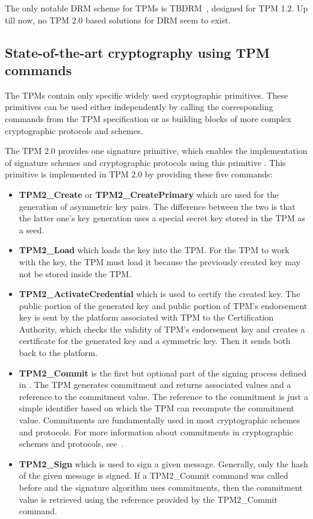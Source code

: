 The only notable DRM scheme for TPMs is TBDRM~\cite{yu2009tbdrm}, designed for TPM 1.2. Up till now, no TPM 2.0 based solutions for DRM seem to exist. 

\subsection{State-of-the-art cryptography using TPM commands}
The TPMs contain only specific widely used cryptographic primitives. These primitives can be used either independently by calling the corresponding commands from the TPM specification or as building blocks of more complex cryptographic protocols and schemes. 

The TPM 2.0 provides one signature primitive, which enables the implementation of signature schemes and cryptographic protocols using this primitive \cite{chen2013flexible}. This primitive is implemented in TPM 2.0 by providing these five commands:
\begin{itemize}
    \item \textbf{TPM2\_Create} or \textbf{TPM2\_CreatePrimary} which are used for the generation of asymmetric key pairs. The difference between the two is that the latter one's key generation uses a special secret key stored in the TPM as a seed.
    \item \textbf{TPM2\_Load} which loads the key into the TPM. For the TPM to work with the key, the TPM must load it because the previously created key may not be stored inside the TPM.
    \item \textbf{TPM2\_ActivateCredential} which is used to certify the created key. The public portion of the generated key and public portion of TPM's endorsement key is sent by the platform associated with TPM to the Certification Authority, which checks the validity of TPM's endorsement key and creates a certificate for the generated key and a symmetric key. Then it sends both back to the platform.
    \item \textbf{TPM2\_Commit} is the first but optional part of the signing process defined in \cite{chen2013flexible}. The TPM generates commitment and returns associated values and a reference to the commitment value. The reference to the commitment is just a simple identifier based on which the TPM can recompute the commitment value. Commitments are fundamentally used in most cryptographic schemes and protocols. For more information about commitments in cryptographic schemes and protocols, see~\cite{damgaard1998commitment}. 
    \item \textbf{TPM2\_Sign} which is used to sign a given message. Generally, only the hash of the given message is signed. If a TPM2\_Commit command was called before and the signature algorithm uses commitments, then the commitment value is retrieved using the reference provided by the TPM2\_Commit command.
\end{itemize}
